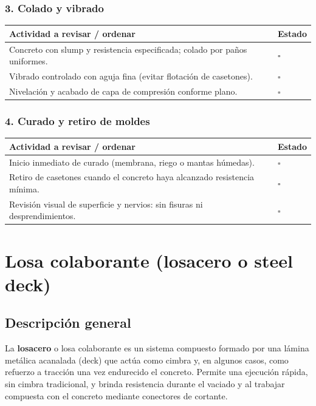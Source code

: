 \documentclass[12pt]{article}
\newcommand{\cbox}{\(\square\)}
\renewcommand{\cbox}{\(\square\)} %
\begin{document}
 \subsubsection*{3. Colado y vibrado}
 \begin{tabularx}{\linewidth}{>{\raggedright\arraybackslash}p{0.93\linewidth} >{\centering\arraybackslash}m{0.07\linewidth}}
 	\toprule
 	\textbf{Actividad a revisar / ordenar} & \textbf{Estado}\\
 	\midrule
 	Concreto con slump y resistencia especificada; colado por paños uniformes. & \cbox \\
 	Vibrado controlado con aguja fina (evitar flotación de casetones). & \cbox \\
 	Nivelación y acabado de capa de compresión conforme plano. & \cbox \\
 	\bottomrule
 \end{tabularx}
 
 \subsubsection*{4. Curado y retiro de moldes}
 \begin{tabularx}{\linewidth}{>{\raggedright\arraybackslash}p{0.93\linewidth} >{\centering\arraybackslash}m{0.07\linewidth}}
 	\toprule
 	\textbf{Actividad a revisar / ordenar} & \textbf{Estado}\\
 	\midrule
 	Inicio inmediato de curado (membrana, riego o mantas húmedas). & \cbox \\
 	Retiro de casetones cuando el concreto haya alcanzado resistencia mínima. & \cbox \\
 	Revisión visual de superficie y nervios: sin fisuras ni desprendimientos. & \cbox \\
 	\bottomrule
 \end{tabularx}
 
 
 \section{Losa colaborante (losacero o steel deck)}
 
 \subsection*{Descripción general}
 La \textbf{losacero} o losa colaborante es un sistema compuesto formado por una lámina metálica acanalada (deck) que actúa como cimbra y, en algunos casos, como refuerzo a tracción una vez endurecido el concreto. Permite una ejecución rápida, sin cimbra tradicional, y brinda resistencia durante el vaciado y al trabajar compuesta con el concreto mediante conectores de cortante.
 
\end{document}

